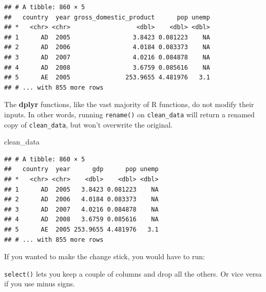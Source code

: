 \documentclass[12pt,oneside,openany]{book}
\newenvironment{Shaded}{\begin{snugshade}}{\end{snugshade}}
\newcommand{\KeywordTok}[1]{\textcolor[rgb]{0.13,0.29,0.53}{\textbf{#1}}}
\newcommand{\DataTypeTok}[1]{\textcolor[rgb]{0.13,0.29,0.53}{#1}}
\newcommand{\StringTok}[1]{\textcolor[rgb]{0.31,0.60,0.02}{#1}}
\newcommand{\OperatorTok}[1]{\textcolor[rgb]{0.81,0.36,0.00}{\textbf{#1}}}
\newcommand{\NormalTok}[1]{#1}
\begin{document}
\begin{verbatim}
## # A tibble: 860 × 5
##   country  year gross_domestic_product      pop unemp
## *   <chr> <chr>                  <dbl>    <dbl> <dbl>
## 1      AD  2005                 3.8423 0.081223    NA
## 2      AD  2006                 4.0184 0.083373    NA
## 3      AD  2007                 4.0216 0.084878    NA
## 4      AD  2008                 3.6759 0.085616    NA
## 5      AE  2005               253.9655 4.481976   3.1
## # ... with 855 more rows
\end{verbatim}

The \textbf{dplyr} functions, like the vast majority of R functions, do
not modify their inputs. In other words, running \texttt{rename()} on
\texttt{clean\_data} will return a renamed copy of \texttt{clean\_data},
but won't overwrite the original.

\begin{Shaded}
\begin{Highlighting}[]
\NormalTok{clean_data}
\end{Highlighting}
\end{Shaded}

\begin{verbatim}
## # A tibble: 860 × 5
##   country  year      gdp      pop unemp
## *   <chr> <chr>    <dbl>    <dbl> <dbl>
## 1      AD  2005   3.8423 0.081223    NA
## 2      AD  2006   4.0184 0.083373    NA
## 3      AD  2007   4.0216 0.084878    NA
## 4      AD  2008   3.6759 0.085616    NA
## 5      AE  2005 253.9655 4.481976   3.1
## # ... with 855 more rows
\end{verbatim}

If you wanted to make the change stick, you would have to run:

\begin{Shaded}
\end{Shaded}

\texttt{select()} lets you keep a couple of columns and drop all the
others. Or vice versa if you use minus signs.

\begin{Shaded}
\end{Shaded}
\end{document}
